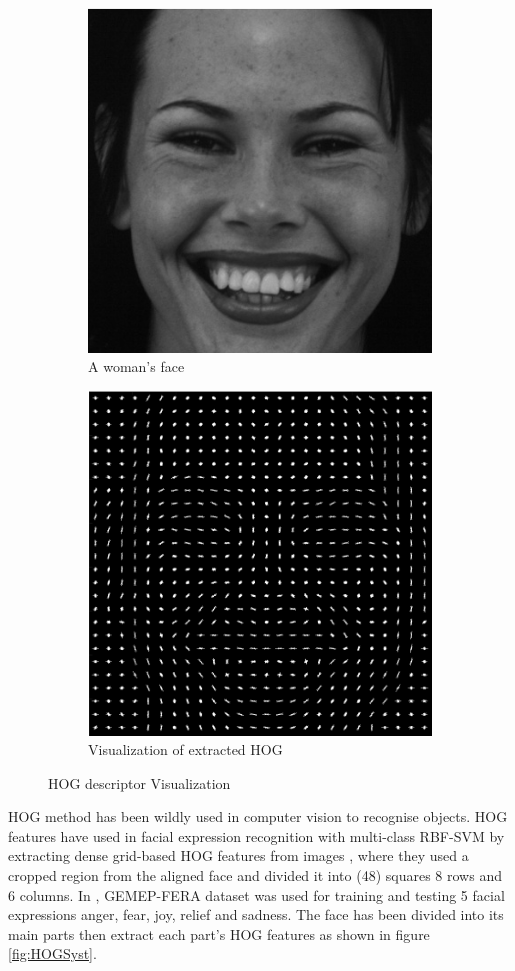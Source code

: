 \begin{figure}
\centering
\begin{subfigure}{.5\textwidth}
  \centering
  \includegraphics[width=.7\linewidth]{Chapter4/Figs/FaceHOG.png}
  \caption{A woman's face}
  \label{fig:sub1}
\end{subfigure}%
\begin{subfigure}{.5\textwidth}
  \centering
  \includegraphics[width=.7\linewidth]{Chapter4/Figs/HOG.png}
  \caption{Visualization of extracted HOG }
  \label{fig:sub2}
\end{subfigure}
\caption{HOG descriptor Visualization}
\label{fig:HOGVisual}
\end{figure}



HOG method has been wildly used in computer vision to recognise objects. HOG features have used in facial expression recognition with multi-class RBF-SVM by extracting dense grid-based HOG features from images \citep{dahmane2011emotion}, where they used a cropped region from the aligned face and  divided it into (48) squares 8 rows and 6 columns. In \citet{dahmane2011emotion}, GEMEP-FERA dataset was used for training and testing 5 facial expressions anger, fear, joy, relief and sadness. The face has been divided into its main parts then extract each part's HOG features as shown in figure \ref{fig:HOGSyst}.


